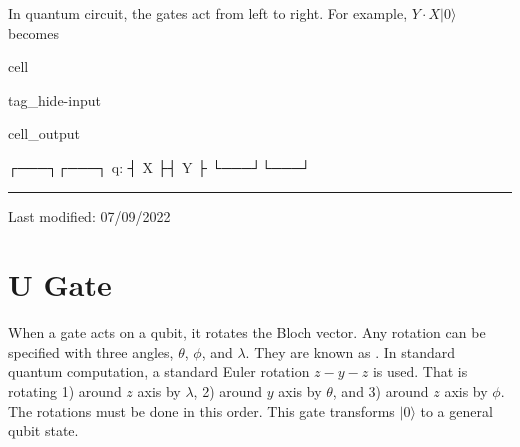 \documentclass[letterpaper,10pt,english]{jupyterBook}
\begin{document}
\sphinxAtStartPar
In quantum circuit, the gates act from left to right.  For example,  \(Y\cdot X |0\rangle\) becomes

\begin{sphinxuseclass}{cell}
\begin{sphinxuseclass}{tag_hide-input}\begin{sphinxVerbatimOutput}

\begin{sphinxuseclass}{cell_output}
\begin{sphinxVerbatim}[commandchars=\\\{\}]
   ┌───┐┌───┐
q: ┤ X ├┤ Y ├
   └───┘└───┘
\end{sphinxVerbatim}

\end{sphinxuseclass}\end{sphinxVerbatimOutput}

\end{sphinxuseclass}
\end{sphinxuseclass}

\bigskip\hrule\bigskip


\sphinxAtStartPar
Last modified: 07/09/2022

\sphinxstepscope


\section{U Gate}
\label{\detokenize{q1gates/u:u-gate}}\label{\detokenize{q1gates/u:sec-ugate}}\label{\detokenize{q1gates/u::doc}}
\sphinxAtStartPar
When a gate acts on a qubit, it rotates the Bloch vector.  Any rotation can be specified with three angles, \(\theta\), \(\phi\), and \(\lambda\).  They are known as . In standard quantum computation, a standard Euler rotation \(z-y-z\) is used.  That is rotating 1) around \(z\) axis by \(\lambda\), 2) around \(y\) axis by \(\theta\), and 3) around \(z\) axis by \(\phi\).  The rotations must be done in this order.  This gate transforms \(|0\rangle\) to a general qubit state.

\sphinxAtStartPar
{}
\end{document}
